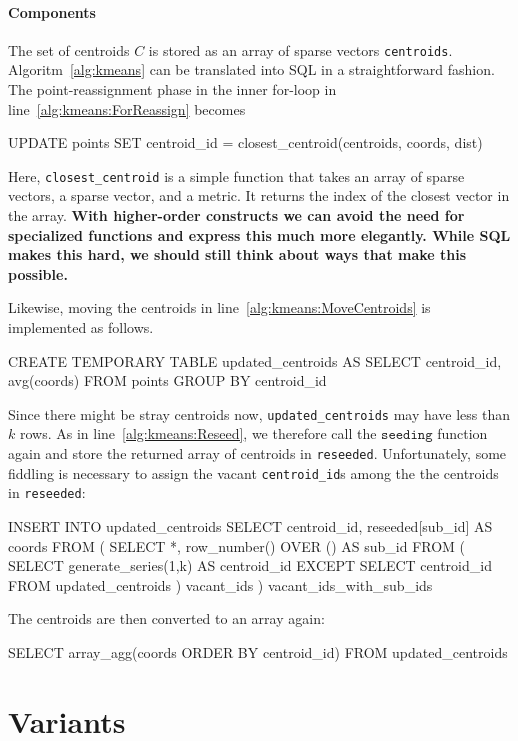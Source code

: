 \documentclass[letterpaper,11pt]{scrreprt}
\numberwithin{equation}{section}
\newcommand{\todo}[1]{\textbf{\color{red}#1}}
\theoremstyle{algorithm}
\begin{document}
\paragraph{Components}

The set of centroids $C$ is stored as an array of sparse vectors \texttt{centroids}. Algoritm~\ref{alg:kmeans} can be translated into SQL in a straightforward fashion. The point-reassignment phase in the inner for-loop in line~\ref{alg:kmeans:ForReassign} becomes
\begin{sqlcode}
	UPDATE points SET centroid_id = closest_centroid(centroids, coords, dist)
\end{sqlcode}
Here, \texttt{closest\_centroid} is a simple function that takes an array of sparse vectors, a sparse vector, and a metric. It returns the index of the closest vector in the array. \todo{With higher-order constructs we can avoid the need for specialized functions and express this much more elegantly. While SQL makes this hard, we should still think about ways that make this possible.}

Likewise, moving the centroids in line~\ref{alg:kmeans:MoveCentroids} is implemented as follows.
\begin{sqlcode}
	CREATE TEMPORARY TABLE updated_centroids AS
	SELECT centroid_id, avg(coords) FROM points GROUP BY centroid_id
\end{sqlcode}
Since there might be stray centroids now, \texttt{updated\_centroids} may have less than $k$ rows. As in line~\ref{alg:kmeans:Reseed}, we therefore call the $\texttt{seeding}$ function again and store the returned array of centroids in \texttt{reseeded}. Unfortunately, some fiddling is necessary to assign the vacant \texttt{centroid\_id}s among the the centroids in \texttt{reseeded}:
\begin{sqlcode}
	INSERT INTO updated_centroids
	SELECT centroid_id, reseeded[sub_id] AS coords
	FROM (
	    SELECT *, row_number() OVER () AS sub_id
	    FROM (
	        SELECT generate_series(1,k) AS centroid_id
	        EXCEPT
	        SELECT centroid_id FROM updated_centroids
	    ) vacant_ids
	) vacant_ids_with_sub_ids
\end{sqlcode}
The centroids are then converted to an array again:
\begin{sqlcode}
	SELECT array_agg(coords ORDER BY centroid_id) FROM updated_centroids
\end{sqlcode}


\section{Variants}
\end{document}
